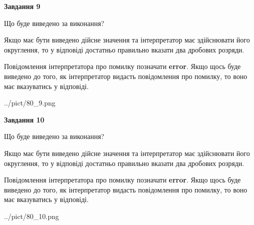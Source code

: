 \documentclass[12pt, ukrainian]{article}
\begin{document}
{\begin {Large}
{\begin {center}\textbf{Завдання 9}\end {center}}\par
Що буде виведено за виконання? \par

Якщо має бути виведено дійсне значення та інтерпретатор має здійснювати його округлення, 
то у відповіді достатньо правильно вказати два дробових розряди.

Повідомлення інтерпретатора про помилку позначати \textbf{error}.
Якщо щось буде виведено до того, як інтерпретатор видасть повідомлення про помилку, 
то воно має вказуватись у відповіді. \par

\begin{center}
	{../pict/80_9.png}
\end{center}
\newpage

{\begin {center}\textbf{Завдання 10}\end {center}}\par
Що буде виведено за виконання? \par

Якщо має бути виведено дійсне значення та інтерпретатор має здійснювати його округлення, 
то у відповіді достатньо правильно вказати два дробових розряди.

Повідомлення інтерпретатора про помилку позначати \textbf{error}.
Якщо щось буде виведено до того, як інтерпретатор видасть повідомлення про помилку, 
то воно має вказуватись у відповіді. \par

\begin{center}
	{../pict/80_10.png}
\end{center}
\newpage

\end {Large}}
\end{document}
